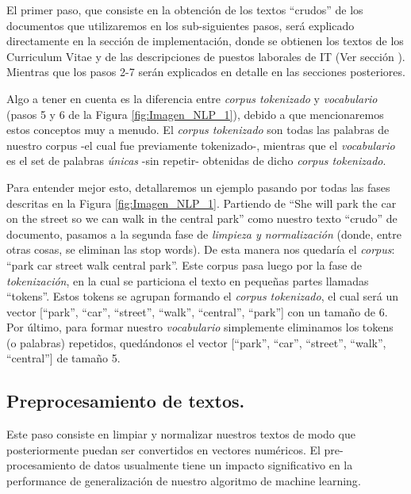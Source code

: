 \documentclass[12pt,a4paper]{article}
\begin{document}
\begin{sloppypar}
\cleardoublepage

El primer paso, que consiste en la obtención de los textos “crudos” de los documentos que utilizaremos en los sub-siguientes pasos, será explicado directamente en la sección de implementación, donde se obtienen los textos de los Curriculum Vitae y de las descripciones de puestos laborales de IT (Ver sección \textit{}). Mientras que los pasos 2-7 serán explicados en detalle en las secciones posteriores. 

Algo a tener en cuenta es la diferencia entre \textit{corpus tokenizado} y \textit{vocabulario} (pasos 5 y 6 de la Figura \ref{fig:Imagen_NLP_1}), debido a que mencionaremos estos conceptos muy a menudo. El \textit{corpus tokenizado} son todas las palabras de nuestro corpus -el cual fue previamente tokenizado-, mientras que el \textit{vocabulario} es el set de palabras \textit{únicas} -sin repetir- obtenidas de dicho \textit{corpus tokenizado}.

Para entender mejor esto, detallaremos un ejemplo pasando por todas las fases descritas en la Figura  \ref{fig:Imagen_NLP_1}. Partiendo de “She will park the car on the street so we can walk in the central park” como nuestro texto “crudo” de documento, pasamos a la segunda fase de \textit{limpieza y normalización} (donde, entre otras cosas, se eliminan las stop words). De esta manera nos quedaría el \textit{corpus}: “park car street walk central park”. Este corpus pasa luego por la fase de \textit{tokenización}, en la cual se particiona el texto en pequeñas partes llamadas “tokens”. Estos tokens se agrupan formando el \textit{corpus tokenizado}, el cual será un vector [“park”, “car”, “street”, “walk”, “central”, “park”] con un tamaño de 6. Por último, para formar nuestro \textit{vocabulario} simplemente eliminamos los tokens (o palabras) repetidos, quedándonos el vector [“park”, “car”, “street”, “walk”, “central”] de tamaño 5. 
\\

\subsection{Preprocesamiento de textos.}\label{Proces_textos}

Este paso consiste en limpiar y normalizar nuestros textos de modo que posteriormente puedan ser convertidos en vectores numéricos. El pre-procesamiento de datos usualmente tiene un impacto significativo en la performance de generalización de nuestro algoritmo de machine learning\cite{preprocessing}.


\end{sloppypar}
\end{document}
